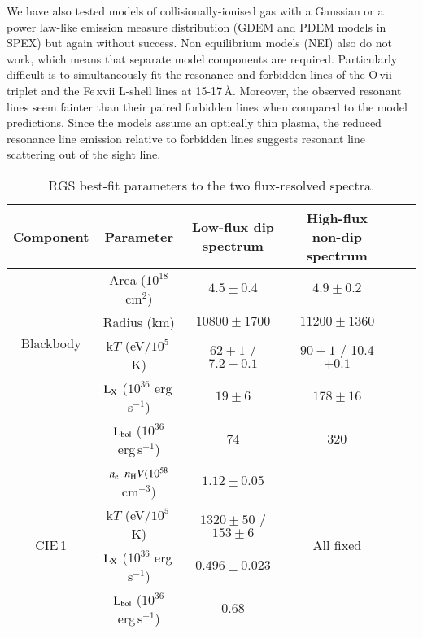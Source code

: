 \documentclass{aa}
\begin{document}
We have also tested models of collisionally-ionised gas with a Gaussian or a
power law-like emission measure distribution ({\scriptsize{GDEM}} and
{\scriptsize{PDEM}} models in SPEX) but again without success.
Non equilibrium models ({\scriptsize{NEI}}) also do not work, which means that
separate model components are required. Particularly difficult is to simultaneously
fit the resonance and forbidden lines of the O\,{\sc vii} triplet and the Fe\,{\sc xvii}
L-shell lines at 15-17\,{\AA}. Moreover, the observed resonant lines seem fainter
than their paired forbidden lines when compared to the model predictions. Since the
models assume an optically thin plasma, the reduced resonance line emission relative
to forbidden lines suggests resonant line scattering out of the sight line.

\begin{table*}
\caption{RGS best-fit parameters to the two flux-resolved spectra.}
\begin{center}
\renewcommand{\arraystretch}{1.1}
\small\addtolength{\tabcolsep}{+5pt}
\begin{tabular}{c | c | c | c c c}
\hline
 Component            & Parameter                    &  Low-flux dip spectrum  &  High-flux non-dip spectrum   \\
\hline
\multirow{4}{*}{Blackbody}
    & Area ($10^{18}$ cm$^2$)                        & $4.5\pm0.4$               & $4.9\pm0.2$    \\
    & Radius (km)                                    & $10800\pm1700$            & $11200\pm1360$    \\
    & k$T$ (eV/$10^5$\,K) \index{\footnote{}}        & $62\pm1$ / $7.2\pm0.1$    & $90\pm1$ / 10.4$\pm0.1$ \\
    & ${\rm L}_{\rm X}$ ($10^{36}$ erg\,s$^{-1}$)    & $19\pm 6$                 & $178\pm 16$ \\
    & ${\rm L}_{\rm bol}$ ($10^{36}$ erg\,s$^{-1}$)  & $74$                      & $320$         \\
\hline
\multirow{6}{*}{CIE\,1}
    & $n_{\rm e}$ $n_{\rm H} V (10^{58}$ cm$^{-3})$  &  $1.12\pm0.05$            & \multirow{6}{*}{All fixed}  \\
    & k$T$ (eV/$10^5$\,K)                            &  $1320\pm50$ / $153\pm6$  & \\
    & ${\rm L}_{\rm X}$ ($10^{36}$ erg\,s$^{-1}$)    &  $0.496\pm0.023$          & \\
    & ${\rm L}_{\rm bol}$ ($10^{36}$ erg\,s$^{-1}$)  &  $0.68$                   & \\

\end{tabular}
\end{center}
\end{table*}
\end{document}
